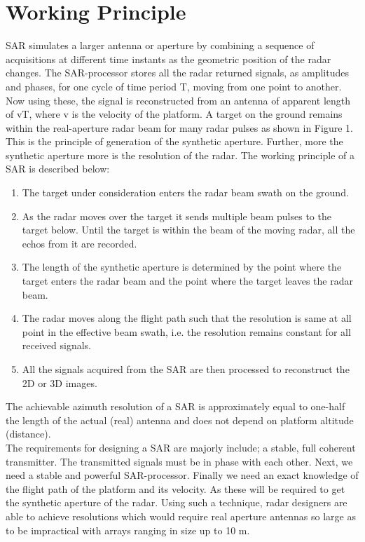 \documentclass[twoside,10pt,a4paper]{article}
\numberwithin{equation}{section}					%
\numberwithin{figure}{section}						%
\begin{document}
\section{Working Principle}
SAR simulates a larger antenna or aperture by combining a sequence of acquisitions at different time instants as the geometric position of the radar changes. The SAR-processor stores all the radar returned signals, as amplitudes and phases, for one cycle of time period T, moving from one point to another. Now using these, the signal is reconstructed from an antenna of apparent length of vT, where v is the velocity of the platform. A target on the ground remains within the real-aperture radar beam for many radar pulses as shown in Figure 1. This is  the principle of generation of the synthetic aperture. Further, more the synthetic aperture more is the resolution of the radar. The working principle of a SAR is described below:
 \begin{enumerate}
     \item The target under consideration enters the radar beam swath on the ground.
     \item As the radar moves over the target it sends multiple beam pulses to the target below. Until the target is within the beam of the moving radar, all the echos from it are recorded.
     \item The length of the synthetic aperture is determined by the point where the target enters the radar beam and the point where the target leaves the radar beam.
     \item The radar moves along the flight path such that the resolution is same at all point in the effective beam swath, i.e. the resolution remains constant for all received signals.
     \item All the signals acquired from the SAR are then processed to reconstruct the 2D or 3D images.
    
 \end{enumerate}
 The achievable azimuth resolution of a SAR is approximately equal to one-half the length of the actual (real) antenna and does not depend on platform altitude (distance).\\
 The requirements for designing a SAR are majorly include; a stable, full coherent transmitter. The transmitted signals must be in phase with each other. Next, we need a stable and powerful SAR-processor. Finally we need an exact knowledge of the flight path of the platform and its velocity. As these will be required to get the synthetic aperture of the radar. Using such a technique, radar designers are able to achieve resolutions which would require real aperture antennas so large as to be impractical with arrays ranging in size up to 10 m.
\end{document}
